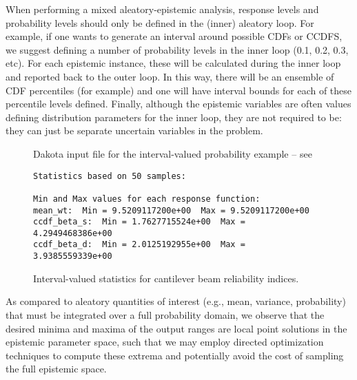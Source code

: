 When performing a mixed aleatory-epistemic analysis, response levels and 
probability levels should only be defined in the (inner) aleatory loop. 
For example, if one wants to generate an interval around possible 
CDFs or CCDFS, we suggest defining a number of probability levels 
in the inner loop (0.1, 0.2, 0.3, etc). For each epistemic instance, 
these will be calculated during the inner loop and reported back to the 
outer loop. In this way, there will be an ensemble of CDF percentiles 
(for example) and one will have interval bounds for each of these 
percentile levels defined. Finally, although the epistemic variables are 
often values defining distribution parameters for the inner loop, 
they are not required to be: they can just be separate uncertain variables 
in the problem. 
\begin{figure}
  \centering
  \begin{bigbox}
    \begin{tiny}
    \end{tiny}
  \end{bigbox}
  \caption{Dakota input file for the interval-valued probability example --
see \protect{} }
  \label{adv_models:2ndprob}
\end{figure}

\begin{figure}
\centering
\begin{bigbox}
\begin{small}
\begin{verbatim}
Statistics based on 50 samples:

Min and Max values for each response function:
mean_wt:  Min = 9.5209117200e+00  Max = 9.5209117200e+00
ccdf_beta_s:  Min = 1.7627715524e+00  Max = 4.2949468386e+00
ccdf_beta_d:  Min = 2.0125192955e+00  Max = 3.9385559339e+00
\end{verbatim}
\end{small}
\end{bigbox}
\caption{Interval-valued statistics for cantilever beam reliability indices.}
\label{adv_models:2ndprob_res}
\end{figure}

As compared to aleatory quantities of interest (e.g., mean, variance,
probability) that must be integrated over a full probability domain,
we observe that the desired minima and maxima of the output ranges are
local point solutions in the epistemic parameter space, such that we
may employ directed optimization techniques to compute these extrema
and potentially avoid the cost of sampling the full epistemic space.

